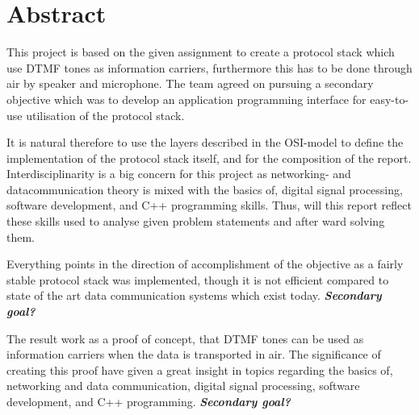 \chapter*{Abstract}
This project is based on the given assignment to create a protocol stack which
use DTMF tones as information carriers, furthermore this has to be done through air
by speaker and microphone. The team agreed on pursuing a secondary objective which
was to develop an application programming interface for easy-to-use utilisation of
the protocol stack.

It is natural therefore to use the layers described in the OSI-model to define
the implementation of the protocol stack itself, and for the composition of the report.
Interdisciplinarity is a big concern for this project as networking- and datacommunication
theory is mixed with the basics of, digital signal processing, software development,
and C++ programming skills. Thus, will this report reflect these skills used to analyse given
problem statements and after ward solving them.

Everything points in the direction of accomplishment of the objective as a fairly stable 
protocol stack was implemented, though it is not efficient compared to state of the art
data communication systems which exist today. \textbf{\textit{Secondary goal?}}

The result work as a proof of concept, that DTMF tones can be used as information carriers
when the data is transported in air. The significance of creating this proof have given a
great insight in topics regarding the basics of, networking and data communication,
digital signal processing, software development, and C++ programming. \textbf{\textit{Secondary goal?}}